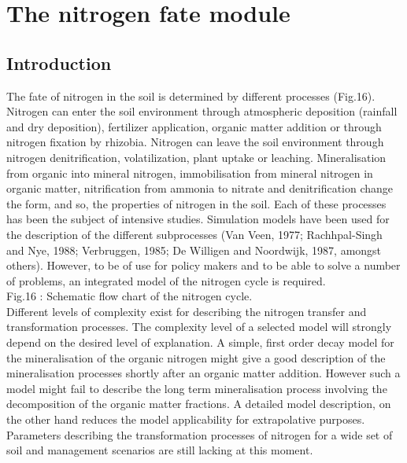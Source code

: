 \chapter{ The nitrogen fate module}
\section{ Introduction}

The fate of nitrogen in the soil is determined by different processes (Fig.16). Nitrogen can enter the soil environment through atmospheric deposition (rainfall and dry deposition), fertilizer application, organic matter addition or through nitrogen fixation by rhizobia. Nitrogen can leave the soil environment through nitrogen denitrification, volatilization, plant uptake or leaching. Mineralisation from organic into mineral nitrogen, immobilisation from mineral nitrogen in organic matter, nitrification from ammonia to nitrate and denitrification change the form, and so, the properties of nitrogen in the soil. Each of these processes has been the subject of intensive studies. Simulation models have been used for the description of the different subprocesses (Van Veen, 1977; Rachhpal-Singh and Nye, 1988; Verbruggen, 1985; De Willigen and Noordwijk, 1987, amongst others). However, to be of use for policy makers and to be able to solve a number of problems, an integrated model of the nitrogen cycle is required.\\

Fig.16 : Schematic flow chart of the nitrogen cycle.\\

Different levels of complexity exist for describing the nitrogen transfer and transformation processes. The complexity level of a selected model will strongly depend on the desired level of explanation. A simple, first order decay model for the mineralisation of the organic nitrogen might give a good description of the mineralisation processes shortly after an organic matter addition. However such a model might fail to describe the long term mineralisation process involving the decomposition of the organic matter fractions. A detailed model description, on the other hand reduces the model applicability for extrapolative purposes. Parameters describing the transformation processes of nitrogen for a wide set of soil and management scenarios are still lacking at this moment.\\

